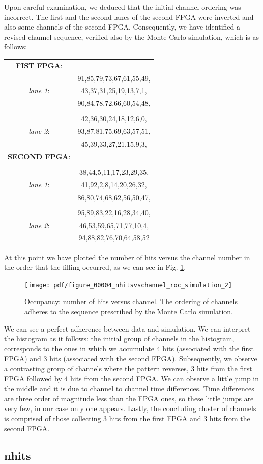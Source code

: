 Upon careful examination, we deduced that the initial channel ordering was incorrect. 
The first and the second lanes of the second FPGA were inverted and also some channels of the second FPGA.
Consequently, we have identified a revised channel sequence, verified also by the Monte Carlo simulation, which is as follows:
\begin{center}
\begin{tabular}{cc}
\textbf{FIST FPGA}: & \\
&91,85,79,73,67,61,55,49,\\
\textit{lane 1}: &43,37,31,25,19,13,7,1,\\
&90,84,78,72,66,60,54,48,\\
& \\
&42,36,30,24,18,12,6,0,\\
\textit{lane 2}: &93,87,81,75,69,63,57,51,\\
&45,39,33,27,21,15,9,3,\\
\textbf{SECOND FPGA}:&\\
&\\
&38,44,5,11,17,23,29,35,\\
\textit{lane 1}:&41,92,2,8,14,20,26,32,\\
&86,80,74,68,62,56,50,47,\\
 & \\
&95,89,83,22,16,28,34,40,\\
\textit{lane 2}:&46,53,59,65,71,77,10,4,\\
&94,88,82,76,70,64,58,52\\
\end{tabular}
\end{center}   
At this point we have plotted the number of hits versus the channel number in the order that the filling occurred, as we can see in Fig. \ref{fig:2}.
\begin{figure}[!h]
\centering
\texttt{[image: pdf/figure\_00004\_nhitsvschannel\_roc\_simulation\_2]}
\caption{Occupancy: number of hits versus channel. The ordering of channels adheres to the sequence prescribed by the Monte Carlo simulation.}
\label{fig:2}
\end{figure}
We can see a perfect adherence between data and simulation. We can interpret the histogram as it follows: the initial group of channels in the histogram,
corresponds to the ones in which we accumulate 4 hits (associated with the first FPGA) and 3 hits (associated with the second FPGA). 
Subsequently, we observe a contrasting group of channels where the pattern reverses, 3 hits from the first FPGA followed by 4 hits from the second FPGA.
We can observe a little jump in the middle and it is due to channel to channel time differences.
Time differences are three order of magnitude less than the FPGA ones, so these little jumps are very few, in our case only one appears.
Lastly, the concluding cluster of channels is comprised of those collecting 3 hits from the first FPGA and 3 hits from the second FPGA.



\subsection{nhits}


